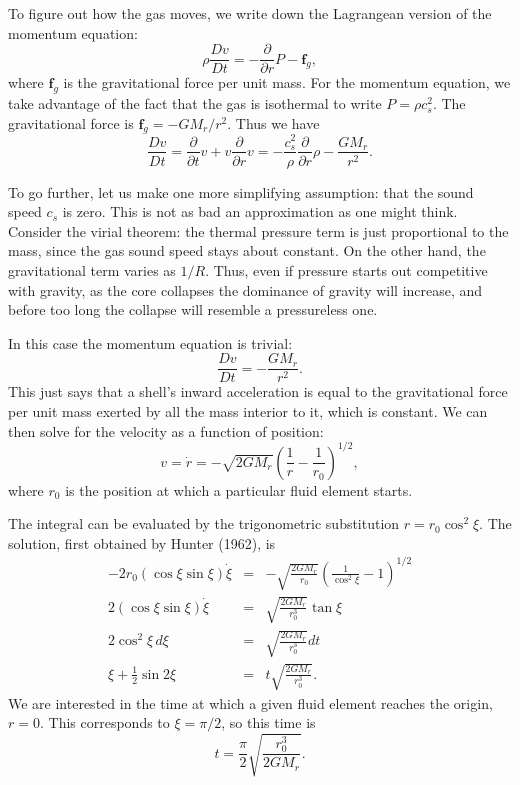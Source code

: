 To figure out how the gas moves, we write down the Lagrangean version of the momentum equation:
\begin{equation}
\rho \frac{Dv}{Dt} = -\frac{\partial}{\partial r}P - \mathbf{f}_g,
\end{equation}
where $\mathbf{f}_g$ is the gravitational force per unit mass. For the momentum equation, we take advantage of the fact that the gas is isothermal to write $P=\rho c_s^2$. The gravitational force is $\mathbf{f}_g = -G M_r / r^2$. Thus we have
\begin{equation}
\frac{Dv}{Dt}= \frac{\partial}{\partial t}v + v\frac{\partial}{\partial r} v= -\frac{c_s^2}{\rho} \frac{\partial}{\partial r}{\rho} - \frac{G M_r}{r^2}.
\end{equation}

To go further, let us make one more simplifying assumption: that the sound speed $c_s$ is zero. This is not as bad an approximation as one might think. Consider the virial theorem: the thermal pressure term is just proportional to the mass, since the gas sound speed stays about constant. On the other hand, the gravitational term varies as $1/R$. Thus, even if pressure starts out competitive with gravity, as the core collapses the dominance of gravity will increase, and before too long the collapse will resemble a pressureless one.

In this case the momentum equation is trivial:
\begin{equation}
\frac{Dv}{Dt} = -\frac{GM_r}{r^2}.
\end{equation}
This just says that a shell's inward acceleration is equal to the gravitational force per unit mass exerted by all the mass interior to it, which is constant. We can then solve for the velocity as a function of position:
\begin{equation}
v = \dot{r} = -\sqrt{2GM_r}\left(\frac{1}{r}-\frac{1}{r_0}\right)^{1/2},
\end{equation}
where $r_0$ is the position at which a particular fluid element starts. 

The integral can be evaluated by the trigonometric substitution $r=r_0 \cos^2\xi$. The solution, first obtained by Hunter (1962), is
\begin{eqnarray}
-2 r_0 (\cos\xi \sin\xi) \dot{\xi} & = & -\sqrt{\frac{2GM_r}{r_0}} \left(\frac{1}{\cos^2\xi}-1\right)^{1/2} \\
2 (\cos\xi\sin\xi) \dot{\xi} & = & \sqrt{\frac{2GM_r}{r_0^3}}\tan\xi \\
2 \cos^2\xi\, d\xi & = & \sqrt{\frac{2GM_r}{r_0^3}} dt \\
\xi+\frac{1}{2}\sin 2\xi & = & t \sqrt{\frac{2GM_r}{r_0^3}}.
\end{eqnarray}
We are interested in the time at which a given fluid element reaches the origin, $r=0$. This corresponds to $\xi = \pi/2$, so this time is
\begin{equation}
t = \frac{\pi}{2}\sqrt{\frac{r_0^3}{2 G M_r}}.
\end{equation}

